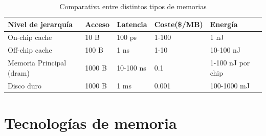 \begin{table}[H]
	\centering
	\begin{tabularx}{0.9\textwidth}{|p{3.5cm}|X|X|p{3cm}|X|}
		\hline
		\textbf{Nivel de jerarquía}    & \textbf{Acceso} & \textbf{Latencia} & \textbf{Coste(\$/MB)} & \textbf{Energía}  \\
		\hline
		On-chip cache                  & 10 B            & 100 ps            & 1-100                 & 1 nJ              \\
		\hline
		Off-chip cache                 & 100 B           & 1 ns              & 1-10                  & 10-100 nJ         \\
		\hline
		Memoria Principal (\gls{dram}) & 1000 B          & 10-100 ns         & 0.1                   & 1-100 nJ por chip \\
		\hline
		Disco duro                     & 1000 B          & 1 ms              & 0.001                 & 100-1000 mJ       \\
		\hline
	\end{tabularx}
	\caption{Comparativa entre distintos tipos de memorias}
\end{table}
\section{Tecnologías de memoria}
